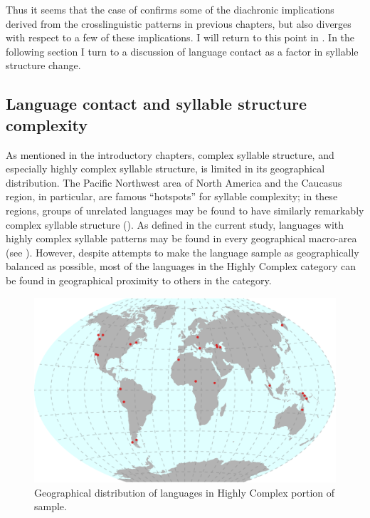   Thus it seems that the case of  confirms some of the diachronic implications derived from the crosslinguistic patterns in previous chapters, but also diverges with respect to a few of these implications. I will return to this point in . In the following section I turn to a discussion of language contact as a factor in syllable structure change.

\subsection{Language contact and syllable structure complexity}\label{sec:8.4.5}

  As mentioned in the introductory chapters, complex syllable structure, and especially highly complex syllable structure, is limited in its geographical distribution. The Pacific Northwest area of North America and the Caucasus region, in particular, are famous ``hotspots'' for syllable complexity; in these regions, groups of unrelated languages may be found to have similarly remarkably complex syllable structure (\citealt{Chirikba2008,ThompsonKinkade1990}). As defined in the current study, languages with highly complex syllable patterns may be found in every geographical macro-area (see ). However, despite attempts to make the language sample as geographically balanced as possible, most of the languages in the Highly Complex category can be found in geographical proximity to others in the category.

  
\begin{figure}
\includegraphics[width=\textwidth]{figures/fig81.png}
\caption{\label{fig:8.1}Geographical distribution of languages in Highly Complex portion of sample.}
\end{figure}


